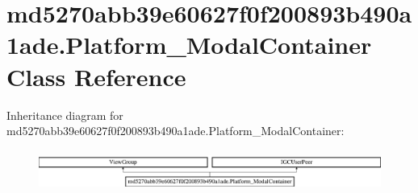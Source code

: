 \hypertarget{classmd5270abb39e60627f0f200893b490a1ade_1_1Platform__ModalContainer}{}\section{md5270abb39e60627f0f200893b490a1ade.\+Platform\+\_\+\+Modal\+Container Class Reference}
\label{classmd5270abb39e60627f0f200893b490a1ade_1_1Platform__ModalContainer}
Inheritance diagram for md5270abb39e60627f0f200893b490a1ade.\+Platform\+\_\+\+Modal\+Container\+:\begin{figure}[H]
\begin{center}
\leavevmode
\includegraphics[height=1.372549cm]{classmd5270abb39e60627f0f200893b490a1ade_1_1Platform__ModalContainer}
\end{center}
\end{figure}
